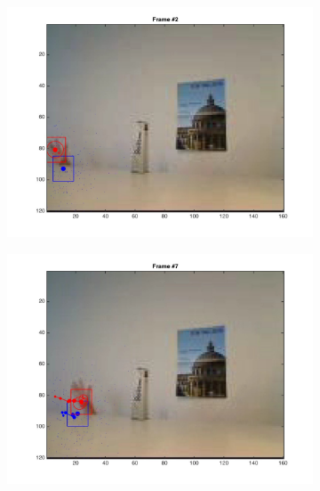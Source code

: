 \documentclass{ethz_report}
\begin{document}
\begin{figure}[h]
    \centering
    \begin{subfigure}[b]{.25\textwidth}
        \centering
        \includegraphics[width=1\linewidth]{images/video2_model_1}
    \end{subfigure}%
    \begin{subfigure}[b]{.25\textwidth}
        \centering
        \includegraphics[width=1\linewidth]{images/video2_model_6}
    \end{subfigure}%
    \begin{subfigure}[b]{.25\textwidth}
        \centering

\end{subfigure}
\end{figure}
\end{document}
